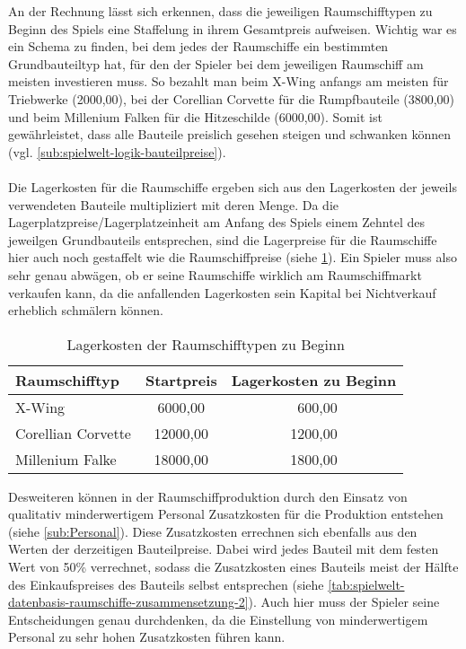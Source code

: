 An der Rechnung lässt sich erkennen, dass die jeweiligen Raumschifftypen zu Beginn des Spiels eine Staffelung in ihrem Gesamtpreis aufweisen. Wichtig war es ein Schema zu finden, bei dem jedes der Raumschiffe ein bestimmten Grundbauteiltyp hat, für den der Spieler bei dem jeweiligen Raumschiff am meisten investieren muss. So bezahlt man beim X-Wing anfangs am meisten für Triebwerke (2000,00\curr{}), bei der Corellian Corvette für die Rumpfbauteile (3800,00\curr{}) und beim Millenium Falken für die Hitzeschilde (6000,00\curr{}). Somit ist gewährleistet, dass alle Bauteile preislich gesehen steigen und schwanken können (vgl. \ref{sub:spielwelt-logik-bauteilpreise}). 
\\
\\
Die Lagerkosten für die Raumschiffe ergeben sich aus den Lagerkosten der jeweils verwendeten Bauteile multipliziert mit deren Menge. Da die Lagerplatzpreise/Lagerplatzeinheit am Anfang des Spiels einem Zehntel des jeweilgen Grundbauteils entsprechen, sind die Lagerpreise für die Raumschiffe hier auch noch gestaffelt wie die Raumschiffpreise (siehe \ref{tab:spielwelt-datenbasis-raumschiffe-zusammensetzung-1}). Ein Spieler muss also sehr genau abwägen, ob er seine Raumschiffe wirklich am Raumschiffmarkt verkaufen kann, da die anfallenden Lagerkosten sein Kapital bei Nichtverkauf erheblich schmälern können.

\begin{table}[ht]\small
     \centering
     \begin{tabular}{ | l | c | c | }
          \hline
          Raumschifftyp & Startpreis & Lagerkosten zu Beginn \\
          \hline \hline
          X-Wing &  6000,00\curr{} & \ 600,00\curr{}\\ \hline
          Corellian Corvette & 12000,00\curr{} & 1200,00\curr{}\\ \hline
          Millenium Falke & 18000,00\curr{} & 1800,00\curr{} \\
          \hline
     \end{tabular}
     \caption{Lagerkosten der Raumschifftypen zu Beginn}
     \label{tab:spielwelt-datenbasis-raumschiffe-zusammensetzung-1}
\end{table}

Desweiteren können in der Raumschiffproduktion durch den Einsatz von qualitativ minderwertigem Personal Zusatzkosten für die Produktion entstehen (siehe \ref{sub:Personal}). Diese Zusatzkosten errechnen sich ebenfalls aus den Werten der derzeitigen Bauteilpreise. Dabei wird jedes Bauteil mit dem festen Wert von 50\% verrechnet, sodass die Zusatzkosten eines Bauteils meist der Hälfte des Einkaufspreises des Bauteils selbst entsprechen (siehe \ref{tab:spielwelt-datenbasis-raumschiffe-zusammensetzung-2}). Auch hier muss der Spieler seine Entscheidungen genau durchdenken, da die Einstellung von minderwertigem Personal zu sehr hohen Zusatzkosten führen kann.


